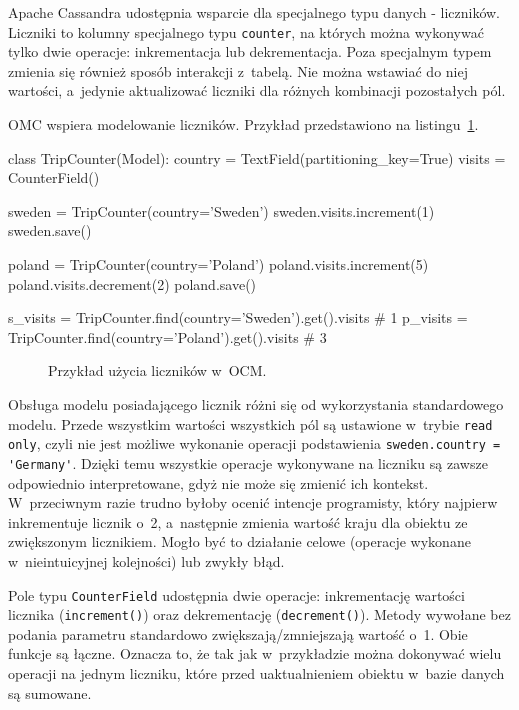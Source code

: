 Apache Cassandra udostępnia wsparcie dla specjalnego typu danych - liczników.~\cite{cassandra_counters} Liczniki to kolumny specjalnego typu \verb+counter+, na których można wykonywać tylko dwie operacje: inkrementacja lub dekrementacja. Poza specjalnym typem zmienia się również sposób interakcji z~tabelą. Nie można wstawiać do niej wartości, a~jedynie aktualizować liczniki dla różnych kombinacji pozostałych pól. 

OMC wspiera modelowanie liczników. Przykład przedstawiono na listingu~\ref{lst:ocm_counter_support}.

\begin{verbbox}[\footnotesize]
class TripCounter(Model):
    country = TextField(partitioning_key=True)
    visits = CounterField()

sweden = TripCounter(country='Sweden')
sweden.visits.increment(1)
sweden.save()

poland = TripCounter(country='Poland')
poland.visits.increment(5)
poland.visits.decrement(2)
poland.save()

s_visits = TripCounter.find(country='Sweden').get().visits    # 1
p_visits = TripCounter.find(country='Poland').get().visits    # 3
\end{verbbox}

\begin{figure}[ht!]
	\centering
	\theverbbox
	\caption{Przykład użycia liczników w~OCM.}
	\label{lst:ocm_counter_support}
\end{figure}

Obsługa modelu posiadającego licznik różni się od wykorzystania standardowego modelu. Przede wszystkim wartości wszystkich pól są ustawione w~trybie \verb+read only+, czyli nie jest możliwe wykonanie operacji podstawienia \verb+sweden.country = 'Germany'+. Dzięki temu wszystkie operacje wykonywane na liczniku są zawsze odpowiednio interpretowane, gdyż nie może się zmienić ich kontekst. W~przeciwnym razie trudno byłoby ocenić intencje programisty, który najpierw inkrementuje licznik o~2, a~następnie zmienia wartość kraju dla obiektu ze zwiększonym licznikiem. Mogło być to działanie celowe (operacje wykonane w~nieintuicyjnej kolejności) lub zwykły błąd. 

Pole typu \verb+CounterField+ udostępnia dwie operacje: inkrementację wartości licznika (\verb+increment()+) oraz dekrementację (\verb+decrement()+). Metody wywołane bez podania parametru standardowo zwiększają/zmniejszają wartość o~1. Obie funkcje są łączne. Oznacza to, że tak jak w~przykładzie można dokonywać wielu operacji na jednym liczniku, które przed uaktualnieniem obiektu w~bazie danych są sumowane.


